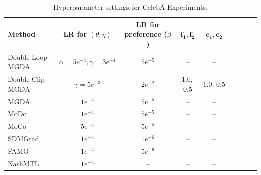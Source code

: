 \documentclass[twoside]{article} %
\theoremstyle{plain}
\theoremstyle{definition}
\theoremstyle{remark}
\begin{document}
\begin{table}[ht]
\centering
\small
\caption{Hyperparameter settings for CelebA Experiments.}
\label{Table: Learning Rate Hyper-parameter CelebA}
{
\scriptsize
\renewcommand{\arraystretch}{1.08}
\setlength{\tabcolsep}{1.5pt}
\begin{tabular*}{\textwidth}{
    @{\extracolsep{\fill}}
    lcccccccc
    @{}
}
\toprule
\textbf{Method} 
& \textbf{LR for $(\theta,\eta)$} 
& \textbf{LR for preference ($\beta$)} 
& $\boldsymbol{f_1,f_2}$ 
& $\boldsymbol{c_1,c_2}$ \\
\midrule
Double-Loop MGDA 
& $\alpha=5e^{-4},\gamma=3e^{-4}$ 
& $5e^{-5}$ 

& -- 
& -- \\

Double-Clip MGDA 
& $\gamma=5e^{-3}$
& $2e^{-2}$ 
& $1.0$,\,$0.5$ 
& $1.0,\,0.5$ \\

MGDA~\citep{qimgda,MGDA1stwork} 
& $1e^{-4}$ 
& $5e^{-5}$ 
& -- 
& -- \\

MoDo~\citep{MODO} 
& $1e^{-4}$ 
& $5e^{-5}$ 
& -- 

& -- \\

MoCo~\citep{MOCO}
& $5e^{-4}$ 
& $5e^{-5}$ 
& -- 
& -- \\

SDMGrad~\citep{SDMkaiyiJi}
& $1e^{-4}$ 
& $1e^{-6}$ 
& -- 
& -- \\

FAMO~\citep{FAMO}
& $1e^{-4}$ 
& $5e^{-6}$ 
& -- 
& -- \\

NashMTL~\citep{nashMTL}
& $1e^{-4}$ 
& -- 
& -- 
& -- \\
\bottomrule
\end{tabular*}}
\end{table}
\end{document}
